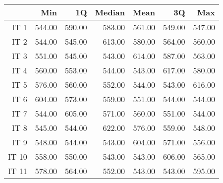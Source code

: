 \begin{table}[ht]
\centering
\begin{tabular}{rrrrrrr}
  \hline
 & Min & 1Q & Median & Mean & 3Q & Max \\ 
  \hline
IT 1 & 544.00 & 590.00 & 583.00 & 561.00 & 549.00 & 547.00 \\ 
  IT 2 & 544.00 & 545.00 & 613.00 & 580.00 & 564.00 & 560.00 \\ 
  IT 3 & 551.00 & 545.00 & 543.00 & 614.00 & 587.00 & 563.00 \\ 
  IT 4 & 560.00 & 553.00 & 544.00 & 543.00 & 617.00 & 580.00 \\ 
  IT 5 & 576.00 & 560.00 & 552.00 & 544.00 & 543.00 & 616.00 \\ 
  IT 6 & 604.00 & 573.00 & 559.00 & 551.00 & 544.00 & 544.00 \\ 
  IT 7 & 544.00 & 605.00 & 571.00 & 560.00 & 551.00 & 544.00 \\ 
  IT 8 & 545.00 & 544.00 & 622.00 & 576.00 & 559.00 & 548.00 \\ 
  IT 9 & 548.00 & 544.00 & 543.00 & 604.00 & 571.00 & 556.00 \\ 
  IT 10 & 558.00 & 550.00 & 543.00 & 543.00 & 606.00 & 565.00 \\ 
  IT 11 & 578.00 & 564.00 & 552.00 & 543.00 & 543.00 & 595.00 \\ 
   \hline
\end{tabular}
\end{table}
